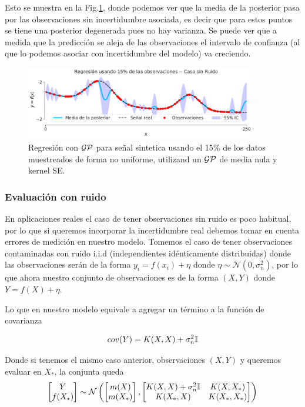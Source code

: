 Esto se muestra en la Fig.\ref{fig:gp_2}, donde podemos ver que la media de la posterior pasa por las observaciones sin incertidumbre asociada, es decir que para estos puntos se tiene una posterior degenerada pues no hay varianza. Se puede ver que a medida que la predicción se aleja de las observaciones el intervalo de confianza (al que lo podemos asociar con incertidumbre del modelo) va creciendo.

\begin{figure}[H]
	\centering
	\includegraphics[width=0.9\textwidth]{img/cap8_posterior_no_ruido}
	\caption{Regresión con $\mathcal{GP}$ para señal sintetica usando el 15$\%$ de los datos muestreados de forma no uniforme, utilizand un $\mathcal{GP}$ de media nula y kernel SE.} 
	\label{fig:gp_2}
\end{figure}

\subsubsection{Evaluación con ruido}

En aplicaciones reales el caso de tener observaciones sin ruido es poco habitual, por lo que si queremos incorporar la incertidumbre real debemos tomar en cuenta errores de medición en nuestro modelo. Tomemos el caso de tener observaciones contaminadas con ruido i.i.d (independientes idénticamente distribuidas) donde las observaciones serán de la forma $y_i = f(x_i) + \eta$ donde $\eta \sim \mathcal{N}(0, \sigma_n^2)$, por lo que ahora nuestro conjunto de observaciones es de la forma $(X,Y)$ donde $Y=f(X) + \eta$.

Lo que en nuestro modelo equivale a agregar un término a la función de covarianza

\begin{equation}
	cov(Y) = K(X, X) + \sigma_n^2{\mathbb I}
\end{equation}

Donde si tenemos el mismo caso anterior, observaciones $(X,Y)$ y queremos evaluar en $X_*$, la conjunta queda
\begin{align}
	\begin{bmatrix} Y \\ f(X_*)  \end{bmatrix}
	\sim \mathcal{N} \left(
	\begin{bmatrix} m(X) \\ m(X_*)  \end{bmatrix}, 
	\begin{bmatrix}
		K(X,X) + \sigma_n^2 {\mathbb I} & K(X, X_*) \\ K(X_*,X) & K(X_*,X_*)
	\end{bmatrix}
	 \right)
\end{align}

